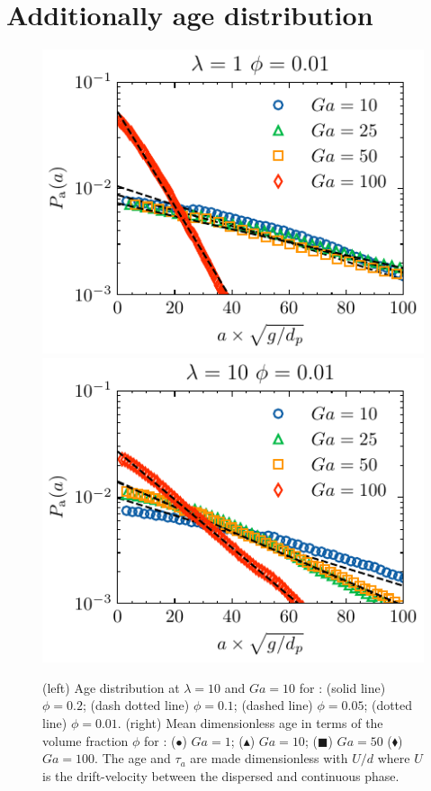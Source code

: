 \section{Additionally age distribution}

\begin{figure}[h!]
    \centering
    \includegraphics[height = 0.3\textwidth]{image/HOMOGENEOUS_NEW/Dist/Pa_l_1_PHI_1.pdf}
    \includegraphics[height = 0.3\textwidth]{image/HOMOGENEOUS_NEW/Dist/Pa_l_10_PHI_1.pdf}
    \caption{(left) Age distribution at $\lambda = 10$ and $Ga = 10$ for : (solid line) $\phi = 0.2$; (dash dotted line) $\phi = 0.1$; (dashed line) $\phi =0.05$; (dotted line) $\phi = 0.01$. 
    (right) Mean dimensionless age in terms of the volume fraction $\phi$ for : 
    ($\bullet$) $Ga=1$; ($\blacktriangle$) $ Ga = 10$; ($\blacksquare$) $Ga = 50$ ($\blacklozenge$) $Ga =100$.
    The age and $\tau_a$ are made dimensionless with $U/d$ where $U$ is the drift-velocity between the dispersed and continuous phase.  }
    \label{fig:age_picture}
\end{figure}
